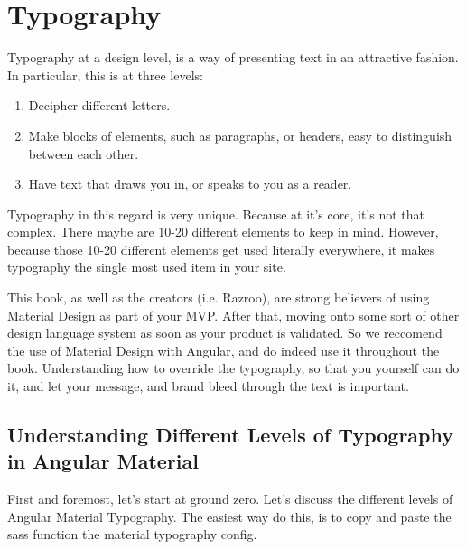 \chapter{ Typography }

Typography at a design level, is a way of presenting text in an attractive 
fashion. In particular, this is at three levels: 
\begin{enumerate}
  \item Decipher different letters.
  \item Make blocks of elements, such as paragraphs, or headers, easy to 
  distinguish between each other. 
  \item Have text that draws you in, or speaks to you as a reader. 
\end{enumerate}

Typography in this regard is very unique. Because at it's core, it's 
not that complex. There maybe are 10-20 different elements to keep in
mind. However, because those 10-20 different elements get used literally 
everywhere, it makes typography the single most used item in your site. 

This book, as well as the creators (i.e. Razroo), are strong believers of 
using Material Design as part of your MVP. After that, moving onto some sort 
of other design language system as soon as your product is validated. So 
we reccomend the use of Material Design with Angular, and do indeed use it
throughout the book. Understanding how to override the typography, so that
you yourself can do it, and let your message, and brand bleed through the 
text is important. 

\section{Understanding Different Levels of Typography in Angular Material}
First and foremost, let's start at ground zero. Let's discuss the different 
levels of Angular Material Typography. The easiest way do this, is to copy 
and paste the sass function the material typography config. 


